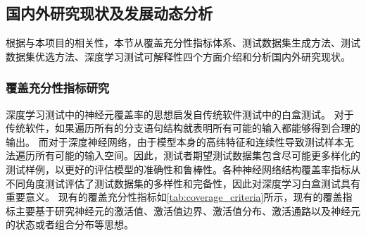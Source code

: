 \subsection{国内外研究现状及发展动态分析}\label{relatedwork}


根据与本项目的相关性，本节从覆盖充分性指标体系、测试数据集生成方法、测试数据集优选方法、深度学习测试可解释性四个方面介绍和分析国内外研究现状。




\subsubsection{覆盖充分性指标研究}

深度学习测试中的神经元覆盖率的思想启发自传统软件测试中的白盒测试。
对于传统软件，如果遍历所有的分支语句结构就表明所有可能的输入都能够得到合理的输出。
而对于深度神经网络，由于模型本身的高纬特征和连续性导致测试样本无法遍历所有可能的输入空间。因此，测试者期望测试数据集包含尽可能更多样化的测试样例，以更好的评估模型的准确性和鲁棒性。各种神经网络结构覆盖率指标从不同角度测试评估了测试数据集的多样性和完备性，因此对深度学习白盒测试具有重要意义。
现有的覆盖充分性指标如\cref{tab:coverage_criteria}所示，现有的覆盖指标主要基于研究神经元的激活值、激活值边界、激活值分布、激活通路以及神经元的状态或者组合分布等思想。

